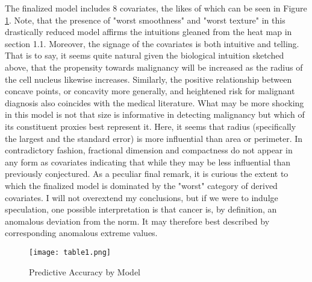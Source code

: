 \documentclass[11pt]{article}
\begin{document}
		
		The finalized model includes 8 covariates, the likes of which can be seen in Figure \ref{fig:coef}.  Note, that the presence of "worst smoothness" and "worst texture" in this drastically reduced model affirms the intuitions gleaned from the heat map in section 1.1.  Moreover, the signage of the covariates is both intuitive and telling.  That is to say, it seems quite natural given the biological intuition sketched above, that the propensity towards malignancy will be increased as the radius of the cell nucleus likewise increases.  Similarly, the positive relationship between concave points, or concavity more generally, and heightened risk for malignant diagnosis also coincides with the medical literature.  What may be more shocking in this model is not that size is informative in detecting malignancy but which of its constituent proxies best represent it.  Here, it seems that radius (specifically the largest and the standard error) is more influential than area or perimeter.  In contradictory fashion, fractional dimension and compactness do not appear in any form as covariates indicating that while they may be less influential than previously conjectured.  As a peculiar final remark, it is curious the extent to which the finalized model is dominated by the "worst" category of derived covariates.  I will not overextend my conclusions, but if we were to indulge speculation, one possible interpretation is that cancer is, by definition, an anomalous deviation from the norm.   It may therefore best described by corresponding anomalous extreme values.  

	\begin{figure}[htbp]
\centerline{\texttt{[image: table1.png]}}
\caption{Predictive Accuracy by Model}\label{fig:coef}
\end{figure}

	
\end{document}

